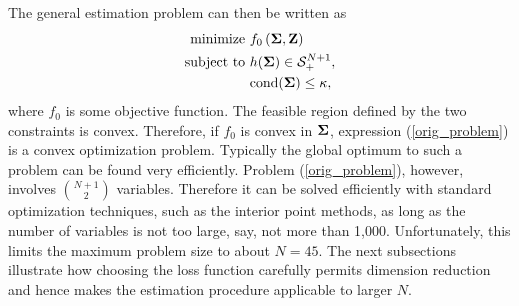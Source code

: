 \documentclass[11pt]{article}
\theoremstyle{definition}
\theoremstyle{definition}
\def\bSigma{{\bf \Sigma}}
\def\Z{{\bf Z}}
\def\cond{\text{cond}}
\begin{document}
The general estimation problem can then be written as
\begin{align}
\label{orig_problem}
\begin{split}
\text{minimize } &  f_0 \left(\bSigma, \Z\right) \\
\text{subject to } & h(\bSigma) \in \mathcal{S}_{+}^{N+1}, \\
& \cond(\bSigma) \leq \kappa,
\end{split}
\end{align}
where $f_0$ is some objective function. The feasible region defined by the two constraints is convex. Therefore,
if $f_0$ is convex in $\bSigma$, expression (\ref{orig_problem}) is a convex optimization problem. 
Typically the global optimum to such a problem can be found very efficiently. Problem (\ref{orig_problem}), however, involves $\binom{N+1}{2}$ variables. Therefore it can be solved efficiently with standard optimization techniques, such as the interior point methods, as long as the number of variables is not too large, say, not more than 1,000. Unfortunately, this limits the maximum problem size  to about $N = 45$. The next subsections illustrate how choosing the loss function carefully permits dimension reduction and hence makes the estimation procedure applicable to larger $N$. 
\end{document}
